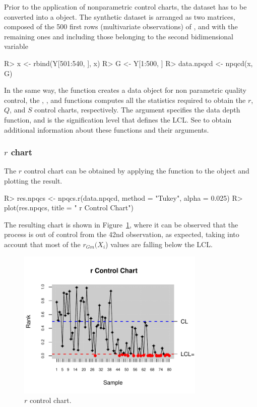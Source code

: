 Prior to the application of nonparametric control charts, the dataset has to be converted into a  object.
The synthetic dataset is arranged as two matrices,  composed of the 500 first rows (multivariate observations) of , 
and  with the remaining ones and including those belonging to the second bidimensional variable 
\begin{example}
R> x <- rbind(Y[501:540, ], x)
R> G <- Y[1:500, ]
R> data.npqcd <- npqcd(x, G)
\end{example}
In the same way, the  function creates a data object for non parametric quality control, 
the , , and  functions computes all the statistics required to obtain the $r$, $Q$, and $S$ control charts, respectively. 
The argument  specifies the data depth function, and  is the signification level that defines the LCL. 
See \cite{flores2016qualityreview} to obtain additional information about these functions and their arguments.

\subsubsection{$r$ chart}
The $r$ control chart can be obtained by applying the  function to the  object and plotting the result.
\begin{example}
R> res.npqcs <- npqcs.r(data.npqcd, method = "Tukey", alpha = 0.025)
R> plot(res.npqcs, title = " r Control Chart")
\end{example}
The resulting chart is shown in  Figure~\ref{fig:rchart}, where it can be observed that the process is out of control from the 42nd observation, as expected, taking into account that most of the $r_{Gm}(X_i$) values are falling below the LCL.
\begin{figure}[!htb]
\begin{center}
\includegraphics[width=0.8\textwidth]{article-rchart-plot}
\caption{$r$ control chart.}
\label{fig:rchart}
\end{center}
\end{figure}

